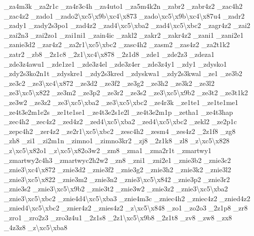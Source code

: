 {\-\_\-za4m3k \-\_\-za2r1c \-\_\-za4r3c4h \-\_\-za4uto1 \-\_\-za5m4k2n \-\_\-zabr2 \-\_\-zabr4z2 \-\_\-zac4h2 \-\_\-zac4z2 \-\_\-zado1 \-\_\-zado2\textbackslash{}xc5\textbackslash{}x9b\textbackslash{}xc4\textbackslash{}x873 \-\_\-zado\textbackslash{}xc5\textbackslash{}x9b\textbackslash{}xc4\textbackslash{}x87u4 \-\_\-zadr2 \-\_\-zady1 \-\_\-zady2s3po1 \-\_\-zad4z2 \-\_\-zad4\textbackslash{}xc5\textbackslash{}xba2 \-\_\-zad4\textbackslash{}xc5\textbackslash{}xbc2 \-\_\-zagr4z2 \-\_\-zai2 \-\_\-zai2n3 \-\_\-zai2zo1 \-\_\-zai1ni1 \-\_\-zain4ic \-\_\-zakl2 \-\_\-zakr2 \-\_\-zakr4z2 \-\_\-zani1 \-\_\-zani2e1 \-\_\-zanie3d2 \-\_\-zar4z2 \-\_\-za2r1\textbackslash{}xc5\textbackslash{}xbc2 \-\_\-zasc4h2 \-\_\-zasm2 \-\_\-zas4z2 \-\_\-za2t1k2 \-\_\-zatr2 \-\_\-zb8 \-\_\-2z1c8 \-\_\-2z1\textbackslash{}xc4\textbackslash{}x878 \-\_\-2z1d8 \-\_\-zde1 \-\_\-zde2z3 \-\_\-zdeza1 \-\_\-zde3z4awu1 \-\_\-zde1ze1 \-\_\-zde3z4el \-\_\-zde3z4er \-\_\-zde3z4y1 \-\_\-zdy1 \-\_\-zdysko1 \-\_\-zdy2s3ko2n1t \-\_\-zdyskre1 \-\_\-zdy2s3kred \-\_\-zdyskwa1 \-\_\-zdy2s3kwal \-\_\-ze1 \-\_\-ze3b2 \-\_\-ze3c2 \-\_\-ze3\textbackslash{}xc4\textbackslash{}x872 \-\_\-ze3d2 \-\_\-ze3f2 \-\_\-ze3g2 \-\_\-ze3h2 \-\_\-ze3k2 \-\_\-ze3l2 \-\_\-ze3\textbackslash{}xc5\textbackslash{}x822 \-\_\-ze3m2 \-\_\-ze3p2 \-\_\-ze3r2 \-\_\-ze3s2 \-\_\-ze3\textbackslash{}xc5\textbackslash{}x9b2 \-\_\-ze3t2 \-\_\-ze3t1k2 \-\_\-ze3w2 \-\_\-ze3z2 \-\_\-ze3\textbackslash{}xc5\textbackslash{}xba2 \-\_\-ze3\textbackslash{}xc5\textbackslash{}xbc2 \-\_\-ze4r3k \-\_\-ze1te1 \-\_\-ze1te1me1 \-\_\-ze4t3e2m1e2s \-\_\-ze1te1se1 \-\_\-ze4t3e2s1e2l \-\_\-ze4t3e2m1p \-\_\-zetha1 \-\_\-ze4t3hap \-\_\-zec4h2 \-\_\-zec4z2 \-\_\-zed4z2 \-\_\-zed4\textbackslash{}xc5\textbackslash{}xba2 \-\_\-zed4\textbackslash{}xc5\textbackslash{}xbc2 \-\_\-zekl2 \-\_\-ze2p1c \-\_\-zepc4h2 \-\_\-zer4z2 \-\_\-ze2r1\textbackslash{}xc5\textbackslash{}xbc2 \-\_\-zesc4h2 \-\_\-zesm4 \-\_\-zes4z2 \-\_\-2z1f8 \-\_\-zg8 \-\_\-zh8 \-\_\-zi1 \-\_\-zi2m1n \-\_\-zimno1 \-\_\-zimno3kr2 \-\_\-zj8 \-\_\-2z1k8 \-\_\-zl8 \-\_\-z\textbackslash{}xc5\textbackslash{}x828 \-\_\-z\textbackslash{}xc5\textbackslash{}x82o1 \-\_\-z\textbackslash{}xc5\textbackslash{}x82o3w2 \-\_\-zm8 \-\_\-zma1 \-\_\-zma2r1t \-\_\-zmartwy1 \-\_\-zmartwy2c4h3 \-\_\-zmartwyc2h2w2 \-\_\-zn8 \-\_\-zni1 \-\_\-zni2e1 \-\_\-znie3b2 \-\_\-znie3c2 \-\_\-znie3\textbackslash{}xc4\textbackslash{}x872 \-\_\-znie3d2 \-\_\-znie3f2 \-\_\-znie3g2 \-\_\-znie3h2 \-\_\-znie3k2 \-\_\-znie3l2 \-\_\-znie3\textbackslash{}xc5\textbackslash{}x822 \-\_\-znie3m2 \-\_\-znie3n2 \-\_\-znie3\textbackslash{}xc5\textbackslash{}x842 \-\_\-znie3p2 \-\_\-znie3r2 \-\_\-znie3s2 \-\_\-znie3\textbackslash{}xc5\textbackslash{}x9b2 \-\_\-znie3t2 \-\_\-znie3w2 \-\_\-znie3z2 \-\_\-znie3\textbackslash{}xc5\textbackslash{}xba2 \-\_\-znie3\textbackslash{}xc5\textbackslash{}xbc2 \-\_\-znie4d4\textbackslash{}xc5\textbackslash{}xba3 \-\_\-znie4m3c \-\_\-zniec4h2 \-\_\-zniec4z2 \-\_\-znied4z2 \-\_\-znied4\textbackslash{}xc5\textbackslash{}xbc2 \-\_\-znier4z2 \-\_\-znies4z2 \-\_\-z\textbackslash{}xc5\textbackslash{}x848 \-\_\-zo1 \-\_\-zo2o3 \-\_\-2z1p8 \-\_\-zr8 \-\_\-zro1 \-\_\-zro2z3 \-\_\-zro3z4u1 \-\_\-2z1s8 \-\_\-2z1\textbackslash{}xc5\textbackslash{}x9b8 \-\_\-2z1t8 \-\_\-zv8 \-\_\-zw8 \-\_\-zx8 \-\_\-4z3z8 \-\_\-z\textbackslash{}xc5\textbackslash{}xba8 }
